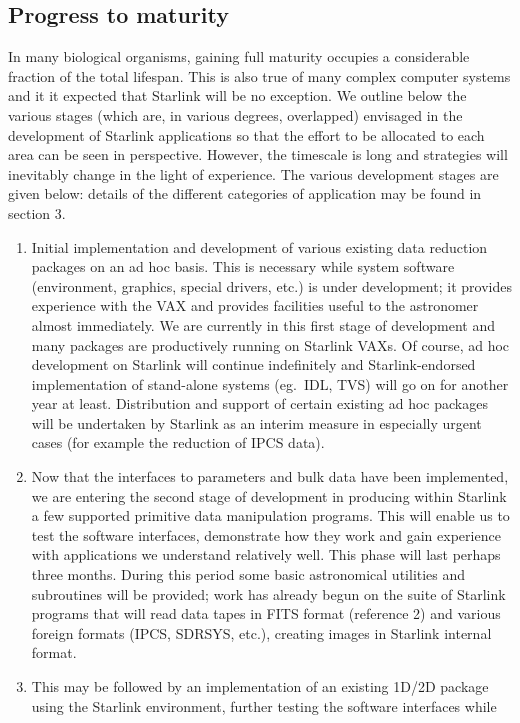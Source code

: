 \subsection {Progress to maturity}
In many biological organisms, gaining full maturity occupies a considerable
fraction of the total lifespan.
This is also true of many complex computer systems and it it expected that
Starlink will be no exception.
We outline below the various stages (which are, in various degrees, overlapped)
envisaged in the development of Starlink applications so that the effort to be
allocated to each area can be seen in perspective.
However, the timescale is long and strategies will inevitably change in the
light of experience.
The various development stages are given below: details of the different
categories of application may be found in section 3.
\begin{enumerate}
\item Initial implementation and development of various existing data reduction
packages on an ad hoc basis.
This is necessary while system software (environment, graphics, special drivers,
etc.) is under development; it provides experience with the VAX and provides
facilities useful to the astronomer almost immediately.
We are currently in this first stage of development and many packages are
productively running on Starlink VAXs.
Of course, ad hoc development on Starlink will continue indefinitely and
Starlink-endorsed implementation of stand-alone systems (eg.\ IDL, TVS) will go
on for another year at least.
Distribution and support of certain existing ad hoc packages will be undertaken
by Starlink as an interim measure in especially urgent cases (for example the
reduction of IPCS data).
\item Now that the interfaces to parameters and bulk data have been implemented,
we are entering the second stage of development in producing within Starlink a
few supported primitive data manipulation programs.
This will enable us to test the software interfaces, demonstrate how they work
and gain experience with applications we understand relatively well.
This phase will last perhaps three months.
During this period some basic astronomical utilities and subroutines will be
provided; work has already begun on the suite of Starlink programs that will
read data tapes in FITS format (reference 2) and various foreign formats
(IPCS, SDRSYS, etc.), creating images in Starlink internal format.
\item This may be followed by an implementation of an existing 1D/2D package
using the Starlink environment, further testing the software interfaces while

\end{enumerate}
